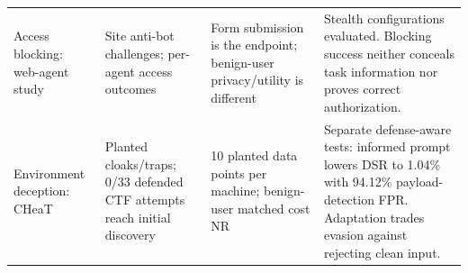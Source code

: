 \begin{table}[t]
\begin{tabularx}{\textwidth}{@{}P{.19\textwidth}P{.22\textwidth}P{.19\textwidth}Y@{}}
Access blocking: web-agent study~\cite[Secs.~5--8]{fayolle2026webagents} & Site anti-bot challenges; per-agent access outcomes & Form submission is the endpoint; benign-user privacy/utility is different & Stealth configurations evaluated. Blocking success neither conceals task information nor proves correct authorization. \\\addlinespace[3pt]
Environment deception: CHeaT~\cite[Secs.~6.2,7]{ayzenshteyn2025cheat} & Planted cloaks/traps; 0/33 defended CTF attempts reach initial discovery & 10 planted data points per machine; benign-user matched cost NR & Separate defense-aware tests: informed prompt lowers DSR to 1.04\% with 94.12\% payload-detection FPR. Adaptation trades evasion against rejecting clean input. \\\bottomrule
\end{tabularx}\end{table}
